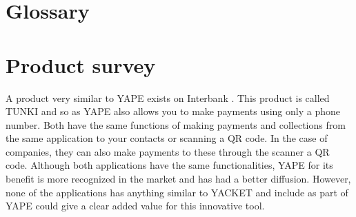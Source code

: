 \documentclass{article}
\begin{document}
\section{Glossary}



\section{Product survey}
A product very similar to YAPE exists on Interbank . This product is called TUNKI and so as YAPE also allows you to make payments using only a phone number.
Both have the same functions of making payments and collections from the
same application to your contacts or scanning a QR code. In the case of
companies, they can also make payments to these through the scanner a
QR code. Although both applications have the same functionalities,
YAPE for its benefit is more recognized in the market and has had a better
diffusion. However, none of the applications has anything similar to
YACKET and include as part of YAPE could give a clear added value
for this innovative tool.
\end{document}
